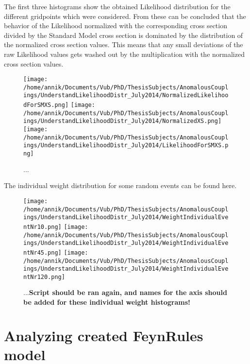 \documentclass[a4paper,12pt]{report}
\begin{document}
The first three histograms show the obtained Likelihood distribution for the different gridpoints which were considered. From these can be concluded that the behavior of the Likelihood normalized with the corresponding cross section divided by the Standard Model cross section is dominated by the distribution of the normalized cross section values. This means that any small deviations of the raw Likelihood values gets washed out by the multiplication with the normalized cross section values.
\begin{figure}[!h]
\texttt{[image: /home/annik/Documents/Vub/PhD/ThesisSubjects/AnomalousCouplings/UnderstandLikelihoodDistr\_July2014/NormalizedLikelihoodForSMXS.png]}
\texttt{[image: /home/annik/Documents/Vub/PhD/ThesisSubjects/AnomalousCouplings/UnderstandLikelihoodDistr\_July2014/NormalizedXS.png]}
\texttt{[image: /home/annik/Documents/Vub/PhD/ThesisSubjects/AnomalousCouplings/UnderstandLikelihoodDistr\_July2014/LikelihoodForSMXS.png]}
\caption{...}
\end{figure}

The individual weight distribution for some random events can be found here.
\begin{figure}[!h]
\texttt{[image: /home/annik/Documents/Vub/PhD/ThesisSubjects/AnomalousCouplings/UnderstandLikelihoodDistr\_July2014/WeightIndividualEventNr10.png]}
\texttt{[image: /home/annik/Documents/Vub/PhD/ThesisSubjects/AnomalousCouplings/UnderstandLikelihoodDistr\_July2014/WeightIndividualEventNr45.png]}
\texttt{[image: /home/annik/Documents/Vub/PhD/ThesisSubjects/AnomalousCouplings/UnderstandLikelihoodDistr\_July2014/WeightIndividualEventNr120.png]}
\caption{...\textbf{Script should be ran again, and names for the axis should be added for these individual weight histograms!}}
\end{figure}


\chapter{Analyzing created FeynRules model}
\end{document}
